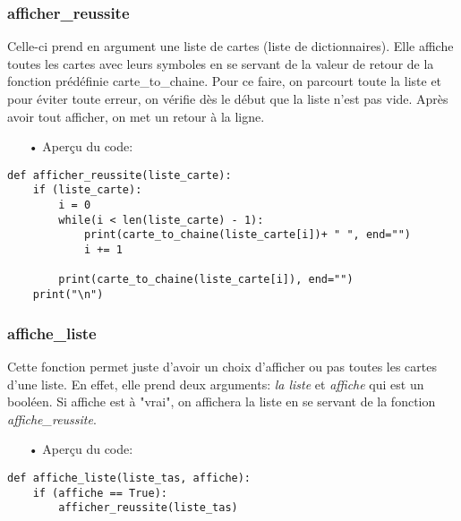 	\subsubsection{afficher\_reussite}
	Celle-ci prend en argument une liste de cartes (liste de dictionnaires). Elle affiche toutes les cartes avec leurs symboles en se servant de la valeur de retour de la  fonction prédéfinie carte\_to\_chaine. Pour ce faire, on parcourt toute la liste et pour éviter toute erreur, on vérifie dès le début que la liste n'est pas vide. Après avoir tout afficher, on met un retour à la ligne.
		\\
	\begin{itemize}
	\color{blue}\item[•]Aperçu du code:
	\end{itemize}
 	
 	\lstset{language=Python}
	\lstset{frame=lines}
	\lstset{basicstyle=\footnotesize}
	\begin{lstlisting}
def afficher_reussite(liste_carte):
    if (liste_carte):
        i = 0
        while(i < len(liste_carte) - 1): 
            print(carte_to_chaine(liste_carte[i])+ " ", end="")
            i += 1

        print(carte_to_chaine(liste_carte[i]), end="")
    print("\n")		

	\end{lstlisting}
	\subsubsection{affiche\_liste}
	Cette fonction permet juste d'avoir un choix d'afficher ou pas toutes les cartes d'une liste. En effet, elle prend deux arguments: \emph{la liste} et \emph{affiche} qui est un booléen. Si affiche est à "vrai", on affichera la liste en se servant de la fonction \emph{affiche\_reussite}.
		\\
	\begin{itemize}
	\color{blue}\item[•]Aperçu du code:
	\end{itemize}
 	
 	\lstset{language=Python}
	\lstset{frame=lines}
	\lstset{basicstyle=\footnotesize}
	\begin{lstlisting}
def affiche_liste(liste_tas, affiche):
    if (affiche == True):
        afficher_reussite(liste_tas)
	
	\end{lstlisting}
